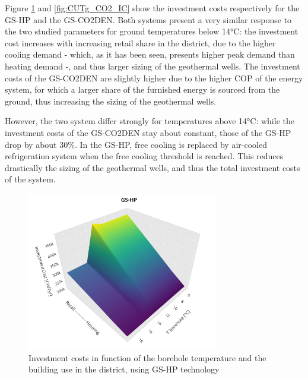 \documentclass{article}
\begin{document}
Figure \ref{fig:CUTg_IC} and \ref{fig:CUTg_CO2_IC} show the investment costs respectively for the GS-HP and the GS-CO2DEN. Both systems present a very similar response to the two studied parameters for ground temperatures below 14\si{\celsius}: the investment cost increases with increasing retail share in the district, due to the higher cooling demand - which, as it has been seen, presents higher peak demand than heating demand -, and thus larger sizing of the geothermal wells. The investment costs of the GS-CO2DEN are slightly higher due to the higher COP of the energy system, for which a larger share of the furnished energy is sourced from the ground, thus increasing the sizing of the geothermal wells. 

However, the two system differ strongly for temperatures above 14\si{\celsius}: while the investment costs of the GS-CO2DEN stay about constant, those of the GS-HP drop by about 30\%. In the GS-HP, free cooling is replaced by air-cooled refrigeration system when the free cooling threshold is reached. This reduces drastically the sizing of the geothermal wells, and thus the total investment costs of the system. \\

\begin{figure}[htp]
	\centering
	\includegraphics[width=0.75\textwidth]{CUTg_SA_IC.png}
	\caption{Investment costs in function of the borehole temperature and the building use in the district, using GS-HP technology}
	\label{fig:CUTg_IC}
\end{figure}
\end{document}
